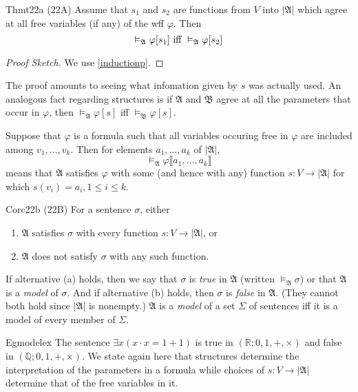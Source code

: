 \begin{reference}{Thm}{t22a}
  (22A) Assume that $s_1$ and $s_2$ are functions from $V$ into $|\mathfrak{A}|$ which agree at all free variables (if any) of the wff $\varphi$. Then
  \[
    \vDash_{\mathfrak{A}}\varphi[s_1]\text{ iff }\vDash_{\mathfrak{A}}\varphi[s_2]\qedhere
  \]
\end{reference}

\begin{proof}[Proof Sketch]
  We use \ref{inductionp}.
\end{proof}
The proof amounts to seeing what infomation given by $s$ was actually used. An analogous fact regarding structures is if $\mathfrak{A}$ and $\mathfrak{B}$ agree at all the parameters that occur in $\varphi$, then $\vDash_{\mathfrak{A}}\varphi[s]$ iff $\vDash_{\mathfrak{B}}\varphi[s]$.

Suppose that $\varphi$ is a formula such that all variables occuring free in $\varphi$ are included among $v_1,\dots,v_k$. Then for elements $a_1,\dots,a_k$ of $|\mathfrak{A}|$,
\[
  \vDash_{\mathfrak{A}} \varphi \llbracket a_1, \dots, a_k \rrbracket
\]
means that $\mathfrak{A}$ satisfies $\varphi$ with some (and hence with any) function $s: V\rightarrow|\mathfrak{A}|$ for which $s(v_i)=a_i,1\leq i\leq k.$

\begin{reference}{Cor}{c22b}
  (22B) For a sentence $\sigma$, either
  \begin{enumerate}[label=(\alph*)]
    \item $\mathfrak{A}$ satisfies $\sigma$ with every function $s: V\rightarrow|\mathfrak{A}|$, or
    \item $\mathfrak{A}$ does not satisfy $\sigma$ with any such function.\qedhere
  \end{enumerate}
\end{reference}

If alternative (a) holds, then we say that $\sigma$ is \textit{true} in $\mathfrak{A}$ (written $\vDash_{\mathfrak{A}}\sigma$) or that $\mathfrak{A}$ is a \textit{model} of $\sigma$. And if alternative (b) holds, then $\sigma$ is \textit{false} in $\mathfrak{A}.$ (They cannot both hold since $|\mathfrak{A}|$ is nonempty.) $\mathfrak{A}$ is a \textit{model} of a set $\Sigma$ of sentences iff it is a model of every member of $\Sigma$.

\begin{reference}{Eg}{modelex}
  The sentence $\exists x(x\cdot x=1+1)$ is true in $(\mathbb{R};0,1,+,\times)$ and false in $(\mathbb{Q};0,1,+,\times)$. We state again here that structures determine the interpretation of the parameters in a formula while choices of $s: V\rightarrow|\mathfrak{A}|$ determine that of the free variables in it.
\end{reference}

